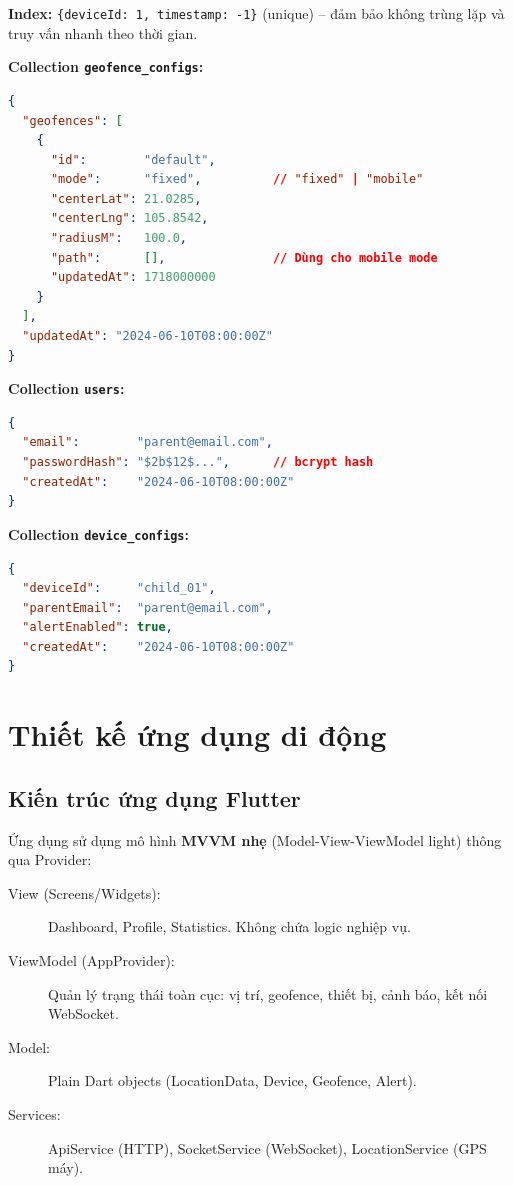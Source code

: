 \textbf{Index:} \texttt{\{deviceId: 1, timestamp: -1\}} (unique) -- đảm bảo không trùng lặp và truy vấn nhanh theo thời gian.

\textbf{Collection \texttt{geofence\_configs}:}
\begin{lstlisting}[language=json, caption=Schema collection geofence\_configs]
{
  "geofences": [
    {
      "id":        "default",
      "mode":      "fixed",          // "fixed" | "mobile"
      "centerLat": 21.0285,
      "centerLng": 105.8542,
      "radiusM":   100.0,
      "path":      [],               // Dùng cho mobile mode
      "updatedAt": 1718000000
    }
  ],
  "updatedAt": "2024-06-10T08:00:00Z"
}
\end{lstlisting}

\textbf{Collection \texttt{users}:}
\begin{lstlisting}[language=json, caption=Schema collection users]
{
  "email":        "parent@email.com",
  "passwordHash": "$2b$12$...",      // bcrypt hash
  "createdAt":    "2024-06-10T08:00:00Z"
}
\end{lstlisting}

\textbf{Collection \texttt{device\_configs}:}
\begin{lstlisting}[language=json, caption=Schema collection device\_configs]
{
  "deviceId":     "child_01",
  "parentEmail":  "parent@email.com",
  "alertEnabled": true,
  "createdAt":    "2024-06-10T08:00:00Z"
}
\end{lstlisting}

\section{Thiết kế ứng dụng di động}

\subsection{Kiến trúc ứng dụng Flutter}

Ứng dụng sử dụng mô hình \textbf{MVVM nhẹ} (Model-View-ViewModel light) thông qua Provider:

\begin{description}
  \item[View (Screens/Widgets):] Dashboard, Profile, Statistics. Không chứa logic nghiệp vụ.
  \item[ViewModel (AppProvider):] Quản lý trạng thái toàn cục: vị trí, geofence, thiết bị, cảnh báo, kết nối WebSocket.
  \item[Model:] Plain Dart objects (LocationData, Device, Geofence, Alert).
  \item[Services:] ApiService (HTTP), SocketService (WebSocket), LocationService (GPS máy).
\end{description}

